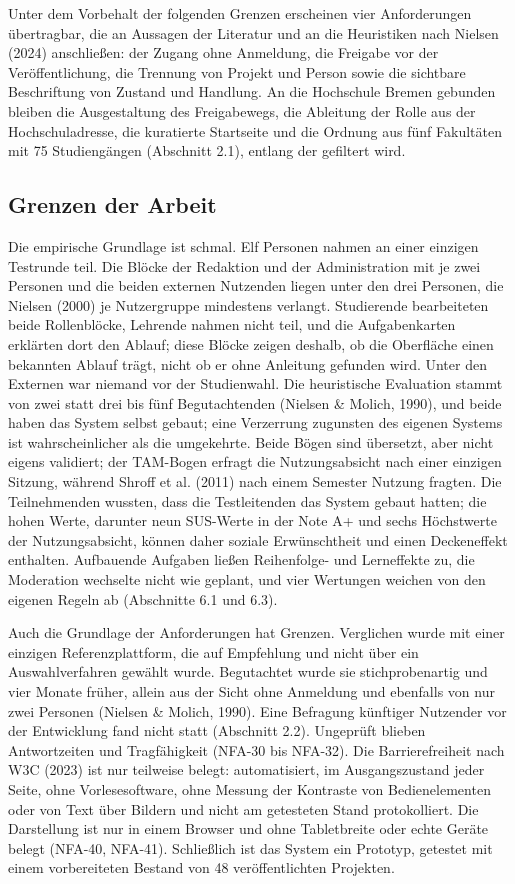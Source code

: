 Unter dem Vorbehalt der folgenden Grenzen erscheinen vier Anforderungen übertragbar, die an Aussagen der Literatur und an die Heuristiken nach Nielsen (2024) anschließen: der Zugang ohne Anmeldung, die Freigabe vor der Veröffentlichung, die Trennung von Projekt und Person sowie die sichtbare Beschriftung von Zustand und Handlung. An die Hochschule Bremen gebunden bleiben die Ausgestaltung des Freigabewegs, die Ableitung der Rolle aus der Hochschuladresse, die kuratierte Startseite und die Ordnung aus fünf Fakultäten mit 75 Studiengängen (Abschnitt 2.1), entlang der gefiltert wird.

\subsection{Grenzen der Arbeit}

Die empirische Grundlage ist schmal. Elf Personen nahmen an einer einzigen Testrunde teil. Die Blöcke der Redaktion und der Administration mit je zwei Personen und die beiden externen Nutzenden liegen unter den drei Personen, die Nielsen (2000) je Nutzergruppe mindestens verlangt. Studierende bearbeiteten beide Rollenblöcke, Lehrende nahmen nicht teil, und die Aufgabenkarten erklärten dort den Ablauf; diese Blöcke zeigen deshalb, ob die Oberfläche einen bekannten Ablauf trägt, nicht ob er ohne Anleitung gefunden wird. Unter den Externen war niemand vor der Studienwahl. Die heuristische Evaluation stammt von zwei statt drei bis fünf Begutachtenden (Nielsen \& Molich, 1990), und beide haben das System selbst gebaut; eine Verzerrung zugunsten des eigenen Systems ist wahrscheinlicher als die umgekehrte. Beide Bögen sind übersetzt, aber nicht eigens validiert; der TAM-Bogen erfragt die Nutzungsabsicht nach einer einzigen Sitzung, während Shroff et al. (2011) nach einem Semester Nutzung fragten. Die Teilnehmenden wussten, dass die Testleitenden das System gebaut hatten; die hohen Werte, darunter neun SUS-Werte in der Note A+ und sechs Höchstwerte der Nutzungsabsicht, können daher soziale Erwünschtheit und einen Deckeneffekt enthalten. Aufbauende Aufgaben ließen Reihenfolge- und Lerneffekte zu, die Moderation wechselte nicht wie geplant, und vier Wertungen weichen von den eigenen Regeln ab (Abschnitte 6.1 und 6.3).

Auch die Grundlage der Anforderungen hat Grenzen. Verglichen wurde mit einer einzigen Referenzplattform, die auf Empfehlung und nicht über ein Auswahlverfahren gewählt wurde. Begutachtet wurde sie stichprobenartig und vier Monate früher, allein aus der Sicht ohne Anmeldung und ebenfalls von nur zwei Personen (Nielsen \& Molich, 1990). Eine Befragung künftiger Nutzender vor der Entwicklung fand nicht statt (Abschnitt 2.2). Ungeprüft blieben Antwortzeiten und Tragfähigkeit (NFA-30 bis NFA-32). Die Barrierefreiheit nach W3C (2023) ist nur teilweise belegt: automatisiert, im Ausgangszustand jeder Seite, ohne Vorlesesoftware, ohne Messung der Kontraste von Bedienelementen oder von Text über Bildern und nicht am getesteten Stand protokolliert. Die Darstellung ist nur in einem Browser und ohne Tabletbreite oder echte Geräte belegt (NFA-40, NFA-41). Schließlich ist das System ein Prototyp, getestet mit einem vorbereiteten Bestand von 48 veröffentlichten Projekten.

